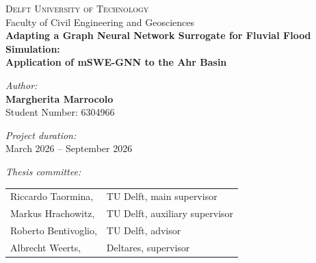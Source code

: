 \documentclass[12pt,a4paper]{report}
\begin{document}
\begin{titlepage}
    \begin{center}
 
        \vspace{1.5cm}
 
        {\Large \textsc{Delft University of Technology}}\\[0.4cm]
        {\large Faculty of Civil Engineering and Geosciences}\\[0.2cm]
 
        \vspace{2cm}
        {\LARGE \bfseries Adapting a Graph Neural Network Surrogate
        for Fluvial Flood Simulation:\\ [0.7cm]
        Application of mSWE-GNN to the Ahr Basin}\\[0.4cm]
        \vspace{3cm}
 
        \begin{minipage}[t]{0.45\textwidth}
            \begin{flushleft}
                \textit{Author:}\\[0.2cm]
                {\large \textbf{Margherita Marrocolo}}\\
                Student Number: 6304966
            \end{flushleft}
        \end{minipage}
        \hfill
        \begin{minipage}[t]{0.45\textwidth}
            \begin{flushright}
                \textit{Project duration:}\\[0.2cm]
                March 2026 -- September 2026
            \end{flushright}
        \end{minipage}
 
        \vspace{2cm}
 
        \begin{minipage}{0.9\textwidth}
            \textit{Thesis committee:}\\[0.3cm]
            \begin{tabular}{@{}ll}
                Riccardo Taormina, & TU Delft, main supervisor \\
                Markus Hrachowitz, & TU Delft, auxiliary supervisor \\
                Roberto Bentivoglio, & TU Delft, advisor \\
                Albrecht Weerts, & Deltares, supervisor \\
            \end{tabular}
        \end{minipage}
 

\end{center}
\end{titlepage}
\end{document}
